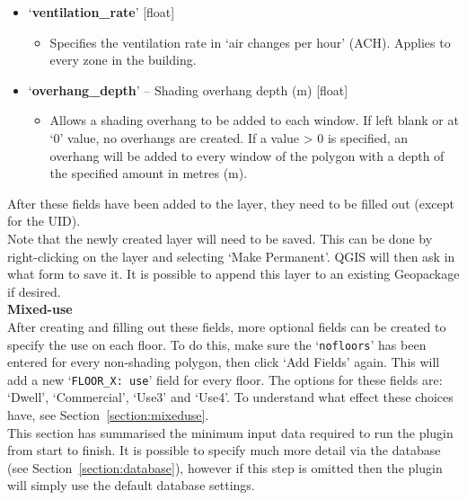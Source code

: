 \documentclass{article}
\begin{document}
\begin{itemize}
\begin{itemize}
    \end{itemize}
    \item `\textbf{ventilation\_rate}' [float]
    \begin{itemize}
        \item Specifies the ventilation rate in `air changes per hour' (ACH). %
        Applies to every zone in the building.
    \end{itemize}
    \item `\textbf{overhang\_depth}' -- {Shading overhang depth (m)} [float]
    \begin{itemize}
        \item Allows a shading overhang to be added to each window. If left blank or at `0' value, no overhangs are created. If a value > 0 is specified, an overhang will be added to every window of the polygon with a depth of the specified amount in metres (m).
    \end{itemize}
\end{itemize}
\vspace{5mm}
After these fields have been added to the layer, they need to be filled out (except for the UID). \\

Note that the newly created layer will need to be saved. This can be done by right-clicking on the layer and selecting `Make Permanent'. QGIS will then ask in what form to save it. It is possible to append this layer to an existing Geopackage if desired. \\

\textbf{Mixed-use} \\
After creating and filling out these fields, more optional fields can be created to specify the use on each floor. To do this, make sure the `\texttt{nofloors}' has been entered for every non-shading polygon, then click `Add Fields' again. This will add a new  `\texttt{FLOOR\_X:~use}' field for every floor. The options for these fields are: `Dwell', `Commercial', `Use3' and `Use4'. To understand what effect these choices have, see Section~\ref{section:mixeduse}. \\

This section has summarised the minimum input data required to run the plugin from start to finish. It is possible to specify much more detail via the database (see Section~\ref{section:database}), however if this step is omitted then the plugin will simply use the default database settings.
\end{document}
